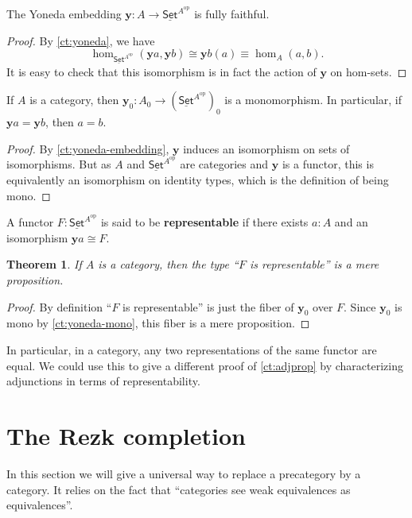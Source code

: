 \documentclass{amsart}
\newcommand{\jdeq}{\equiv}      %
\renewcommand{\set}{\ensuremath{\mathsf{Set}}\xspace}
\newcommand{\uset}{\ensuremath{\underline{\set}}\xspace}
\newtheorem{thm}{Theorem}[section]
\theoremstyle{definition}
\theoremstyle{remark}
\numberwithin{equation}{section}
\newcommand{\op}{^{\textrm{op}}}
\newcommand{\y}{\ensuremath{\mathbf{y}}\xspace}
\begin{document}
\begin{cor}\label{ct:yoneda-embedding}
  The Yoneda embedding $\y :A\to \uset^{A\op}$ is fully faithful.
\end{cor}
\begin{proof}
  By \autoref{ct:yoneda}, we have
  \[ \hom_{\uset^{A\op}}(\y a, \y b) \cong \y b(a) \jdeq \hom_A(a,b). \]
  It is easy to check that this isomorphism is in fact the action of \y on hom-sets.
\end{proof}

\begin{cor}\label{ct:yoneda-mono}
  If $A$ is a category, then $\y_0 : A_0 \to (\uset^{A\op})_0$ is a monomorphism.
  In particular, if $\y a = \y b$, then $a=b$.
\end{cor}
\begin{proof}
  By \autoref{ct:yoneda-embedding}, \y induces an isomorphism on sets of isomorphisms.
  But as $A$ and $\uset^{A\op}$ are categories and \y is a functor, this is equivalently an isomorphism on identity types, which is the definition of being mono.
\end{proof}

\begin{defn}\label{ct:representable}
  A functor $F:\uset^{A\op}$ is said to be \textbf{representable} if there exists $a:A$ and an isomorphism $\y a \cong F$.
\end{defn}

\begin{thm}\label{ct:representable-prop}
  If $A$ is a category, then the type ``$F$ is representable'' is a mere proposition.
\end{thm}
\begin{proof}
  By definition ``$F$ is representable'' is just the fiber of $\y_0$ over $F$.
  Since $\y_0$ is mono by \autoref{ct:yoneda-mono}, this fiber is a mere proposition.
\end{proof}

In particular, in a category, any two representations of the same functor are equal.
We could use this to give a different proof of \autoref{ct:adjprop} by characterizing adjunctions in terms of representability.


\section{The Rezk completion}
\label{sec:rezk}

In this section we will give a universal way to replace a precategory by a category.
It relies on the fact that ``categories see weak equivalences as equivalences''.
\end{document}
